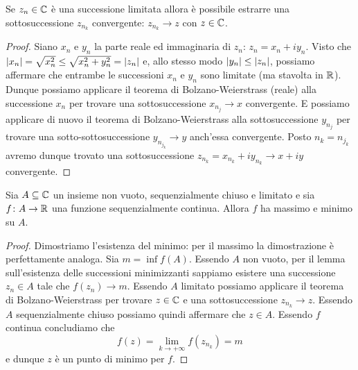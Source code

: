 \begin{theorem}
Se $z_n\in \mathbb C$ è una successione limitata allora
è possibile estrarre una sottosuccessione $z_{n_k}$ convergente:
$z_{n_k} \to z$ con $z\in \mathbb C$.
\end{theorem}
%
\begin{proof}
Siano $x_n$ e $y_n$ la parte reale ed immaginaria di $z_n$: $z_n = x_n + i y_n$. Visto che ${\left|x_n\right|} =\sqrt{x_n^2}\le \sqrt{x_n^2+y_n^2} = {\left|z_n\right|}$ e, allo stesso modo ${\left|y_n\right|} \le {\left|z_n\right|}$,
possiamo affermare che entrambe le successioni $x_n$ e $y_n$ sono limitate (ma stavolta in $\mathbb R$).
Dunque possiamo applicare il teorema di Bolzano-Weierstrass (reale) alla successione $x_n$ per trovare una sottosuccessione $x_{n_j}\to x$ convergente. E possiamo applicare di nuovo il teorema di Bolzano-Weierstrass alla sottosuccessione $y_{n_j}$ per trovare una sotto-sottosuccessione $y_{n_{j_k}}\to y$ anch'essa convergente.
Posto $n_k = n_{j_k}$ avremo dunque trovato una sottosuccessione $z_{n_k} = x_{n_k} + i y_{n_k} \to x+iy$ convergente.
\end{proof}

\begin{theorem}
Sia $A\subseteq \mathbb C$ un insieme non vuoto, sequenzialmente chiuso e limitato e sia $f\colon A \to \mathbb R$ una funzione sequenzialmente continua. Allora $f$ ha massimo e minimo su $A$.
\end{theorem}
%
\begin{proof}
Dimostriamo l'esistenza del minimo: per il massimo la dimostrazione è perfettamente analoga.
Sia $m=\inf f(A)$.
Essendo $A$ non vuoto, per il lemma sull'esistenza delle successioni minimizzanti sappiamo esistere una successione $z_n \in A$ tale che $f(z_n) \to m$.
Essendo $A$ limitato possiamo applicare il teorema di Bolzano-Weierstrass per trovare $z\in \mathbb C$ e una sottosuccessione $z_{n_k} \to z$. Essendo $A$ sequenzialmente chiuso possiamo quindi affermare che $z\in A$. Essendo $f$ continua concludiamo che
\[
f(z) = \lim_{k\to+\infty} f(z_{n_k}) = m
\]
e dunque $z$ è un punto di minimo per $f$.
\end{proof}

